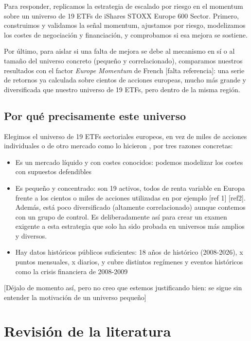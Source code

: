\documentclass[12pt]{report} %
\begin{document}
Para responder, replicamos la estrategia de escalado por riesgo en el momentum sobre un universo de 19 ETFs de iShares STOXX Europe 600 Sector. Primero, construimos y validamos la señal momentum, ajustamos por riesgo, modelizamos los costes de negociación y financiación, y comprobamos si esa mejora se sostiene.

Por último, para aislar si una falta de mejora se debe al mecanismo en sí o al tamaño del universo concreto (pequeño y correlacionado), comparamos nuestros resultados con el factor \textit{Europe Momentum} de French [falta referencia]: una serie de retornos ya calculada sobre cientos de acciones europeas, mucho más grande y diversificada que nuestro universo de 19 ETFs, pero dentro de la misma región.

\section{Por qué precisamente este universo}

Elegimos el universo de 19 ETFs sectoriales europeos, en vez de miles de acciones individuales o de otro mercado como lo hicieron \citet{barroso2015}, por tres razones concretas:

\begin{itemize}
	\item Es un mercado líquido y con costes conocidos: podemos modelizar los costes con supuestos defendibles
	\item Es pequeño y concentrado: son 19 activos, todos de renta variable en Europa frente a los cientos o miles de acciones utilizadas en por ejemplo [ref 1] [ref2]. Además, está poco diversificado (altamente correlacionado) aunque contemos con un grupo de control. Es deliberadamente así para crear un examen exigente a esta estrategia que solo ha sido probada en universos más amplios y diversos.
	\item Hay datos históricos públicos suficientes: 18 años de histórico (2008-2026), x puntos mensuales, x diarios, y cubre distintos regímenes y eventos históricos como la crisis financiera de 2008-2009
\end{itemize}

[Déjalo de momento así, pero no creo que estemos justificando bien: se sigue sin entender la motivación de un universo pequeño]


\chapter{Revisión de la literatura}
\end{document}
